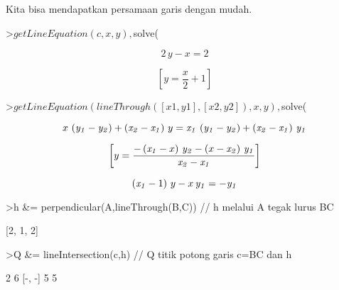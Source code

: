\documentclass{article}
\begin{document}
\begin{eulernotebook}
\begin{eulercomment}
\begin{eulercomment}
\begin{eulercomment}
\begin{eulercomment}
\begin{euleroutput}
\end{euleroutput}
\begin{eulercomment}
Kita bisa mendapatkan persamaan garis dengan mudah.
\end{eulercomment}
\begin{eulerprompt}
>$getLineEquation(c,x,y), $solve(%
\end{eulerprompt}
\begin{eulerformula}
\[
2\,y-x=2
\]
\end{eulerformula}
\begin{eulerformula}
\[
\left[ y=\frac{x}{2}+1 \right] 
\]
\end{eulerformula}
\begin{eulerprompt}
>$getLineEquation(lineThrough([x1,y1],[x2,y2]),x,y), $solve(%
\end{eulerprompt}
\begin{eulerformula}
\[
x\,\left({\it y_1}-{\it y_2}\right)+\left({\it x_2}-{\it x_1}
 \right)\,y={\it x_1}\,\left({\it y_1}-{\it y_2}\right)+\left(
 {\it x_2}-{\it x_1}\right)\,{\it y_1}
\]
\end{eulerformula}
\begin{eulerformula}
\[
\left[ y=\frac{-\left({\it x_1}-x\right)\,{\it y_2}-\left(x-
 {\it x_2}\right)\,{\it y_1}}{{\it x_2}-{\it x_1}} \right] 
\]
\end{eulerformula}
\begin{eulerformula}
\[
\left({\it x_1}-1\right)\,y-x\,{\it y_1}=-{\it y_1}
\]
\end{eulerformula}
\begin{eulerprompt}
>h &= perpendicular(A,lineThrough(B,C)) // h melalui A tegak lurus BC
\end{eulerprompt}
\begin{euleroutput}
  
                                [2, 1, 2]
  
\end{euleroutput}
\begin{eulerprompt}
>Q &= lineIntersection(c,h) // Q titik potong garis c=BC dan h
\end{eulerprompt}
\begin{euleroutput}
  
                                   2  6
                                  [-, -]
                                   5  5
  

\end{euleroutput}
\end{eulercomment}
\end{eulercomment}
\end{eulercomment}
\end{eulercomment}
\end{eulernotebook}
\end{document}
